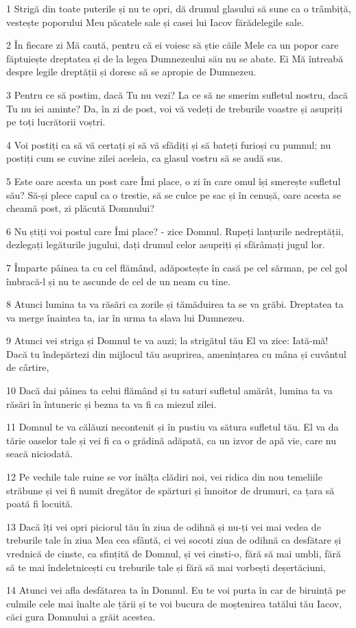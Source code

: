 \par 1 Strigă din toate puterile și nu te opri, dă drumul glasului să sune ca o trâmbiță, vestește poporului Meu păcatele sale și casei lui Iacov fărădelegile sale.
\par 2 În fiecare zi Mă caută, pentru că ei voiesc să știe căile Mele ca un popor care făptuiește dreptatea și de la legea Dumnezeului său nu se abate. Ei Mă întreabă despre legile dreptății și doresc să se apropie de Dumnezeu.
\par 3 Pentru ce să postim, dacă Tu nu vezi? La ce să ne smerim sufletul nostru, dacă Tu nu iei aminte? Da, în zi de post, voi vă vedeți de treburile voastre și asupriți pe toți lucrătorii voștri.
\par 4 Voi postiți ca să vă certați și să vă sfădiți și să bateți furioși cu pumnul; nu postiți cum se cuvine zilei aceleia, ca glasul vostru să se audă sus.
\par 5 Este oare acesta un post care Îmi place, o zi în care omul își smerește sufletul său? Să-și plece capul ca o trestie, să se culce pe sac și în cenușă, oare acesta se cheamă post, zi plăcută Domnului?
\par 6 Nu știți voi postul care Îmi place? - zice Domnul. Rupeți lanțurile nedreptății, dezlegați legăturile jugului, dați drumul celor asupriți și sfărâmați jugul lor.
\par 7 Împarte pâinea ta cu cel flămând, adăpostește în casă pe cel sărman, pe cel gol îmbracă-l și nu te ascunde de cel de un neam cu tine.
\par 8 Atunci lumina ta va răsări ca zorile și tămăduirea ta se va grăbi. Dreptatea ta va merge înaintea ta, iar în urma ta slava lui Dumnezeu.
\par 9 Atunci vei striga și Domnul te va auzi; la strigătul tău El va zice: Iată-mă! Dacă tu îndepărtezi din mijlocul tău asuprirea, amenințarea cu mâna și cuvântul de cârtire,
\par 10 Dacă dai pâinea ta celui flămând și tu saturi sufletul amărât, lumina ta va răsări în întuneric și bezna ta va fi ca miezul zilei.
\par 11 Domnul te va călăuzi necontenit și în pustiu va sătura sufletul tău. El va da tărie oaselor tale și vei fi ca o grădină adăpată, ca un izvor de apă vie, care nu seacă niciodată.
\par 12 Pe vechile tale ruine se vor înălța clădiri noi, vei ridica din nou temeliile străbune și vei fi numit dregător de spărturi și înnoitor de drumuri, ca țara să poată fi locuită.
\par 13 Dacă îți vei opri piciorul tău în ziua de odihnă și nu-ți vei mai vedea de treburile tale în ziua Mea cea sfântă, ci vei socoti ziua de odihnă ca desfătare și vrednică de cinste, ca sfințită de Domnul, și vei cinsti-o, fără să mai umbli, fără să te mai îndeletnicești cu treburile tale și fără să mai vorbești deșertăciuni,
\par 14 Atunci vei afla desfătarea ta în Domnul. Eu te voi purta în car de biruință pe culmile cele mai înalte ale țării și te voi bucura de moștenirea tatălui tău Iacov, căci gura Domnului a grăit acestea.

